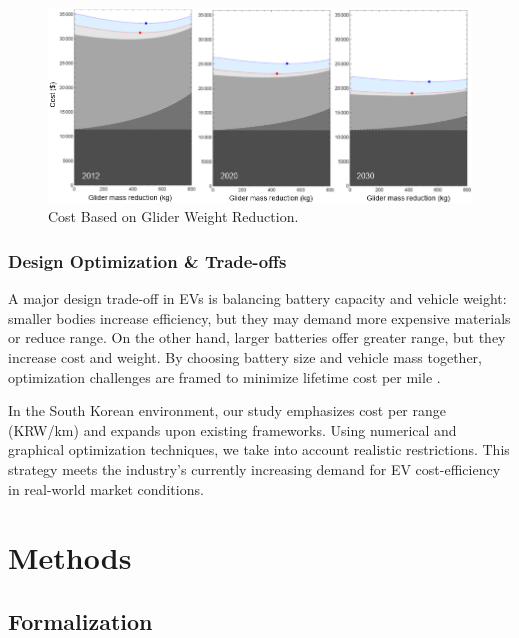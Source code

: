 \documentclass[11pt,twocolumn]{article}
\begin{document}
                \begin{figure}[h]
                    \centering
                    \includegraphics[width=.8\columnwidth]{gliderReduction.png}
                    \caption{Cost Based on Glider Weight Reduction.}
                    \label{gliderReduction}
                \end{figure}
            
            \subsubsection{Design Optimization \& Trade-offs}
                A major design trade-off in EVs is balancing battery capacity and vehicle weight: smaller bodies increase efficiency, but they may demand more expensive materials or reduce range.
                On the other hand, larger batteries offer greater range, but they increase cost and weight.
                By choosing battery size and vehicle mass together, optimization challenges are framed to minimize lifetime cost per mile \cite{nrel23}.
                \par
                In the South Korean environment, our study emphasizes cost per range (KRW/km) and expands upon existing frameworks.
                Using numerical and graphical optimization techniques, we take into account realistic restrictions.
                This strategy meets the industry's currently increasing demand for EV cost-efficiency in real-world market conditions.


    \section{Methods}
        \subsection{Formalization}
            \label{form}
\end{document}
